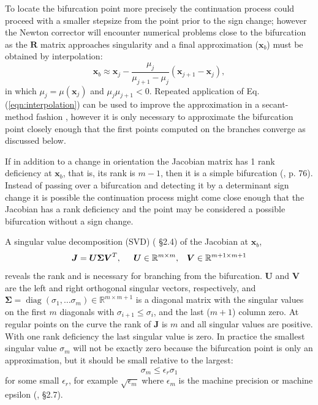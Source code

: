 \documentclass[11pt,openany,twoside]{book}
\numberwithin{equation}{section}		%
\newcommand{\Matrix}[1]{\boldsymbol{#1}}
\newcommand{\Vector}[1]{\boldsymbol{#1}}
\newcommand{\Diag}{\operatorname{diag}}
\begin{document}
To locate the bifurcation point more precisely the
continuation process could proceed with a smaller stepsize from
the point prior to the sign change; however the Newton corrector will
encounter numerical problems close to the bifurcation as the $\Matrix{R}$
matrix approaches singularity
and a final approximation ($\Vector{x}_b$)
must be obtained by interpolation:
\begin{equation}
\label{eqn:interpolation}
\Vector{x}_b \approx \Vector{x}_j - \frac{\mu_j}{\mu_{j+1}
	- \mu_j}\left( \Vector{x}_{j+1} - \Vector{x}_j\right),
\end{equation}
in which $\mu_j = \mu(\Vector{x}_j)$ and $\mu_j\mu_{j+1} < 0$.
Repeated application of Eq. (\ref{eqn:interpolation})
can be used to
improve the approximation in a secant-method fashion \cite{keller1987lectures},
however it is only necessary to approximate the bifurcation
point closely enough that the first points computed on the
branches converge as discussed below.
\par
If in addition to a change in orientation the 
Jacobian matrix has 1 rank deficiency at $\Vector{x}_b$, that is,
its rank is $m-1$,
then it is a simple bifurcation (\cite{allgower1990numerical}, p. 76).
Instead of passing over a bifurcation and detecting it by a determinant sign
change it is possible the continuation process might come close enough
that the Jacobian has a rank deficiency and the point may be considered
a possible bifurcation without a sign change.
\par
A singular value decomposition (SVD) (\cite{golub2013matrix} \S 2.4)
of the Jacobian at $\Vector{x}_b$,
\begin{equation}
\Matrix{J} = \Matrix{U}\Matrix{\Sigma}\Matrix{V}^T, \hspace{0.2in} 
	\Matrix{U} \in \mathbb{R}^{m \times m}, \;\;\;
	\Matrix{V} \in \mathbb{R}^{m+1 \times m+1}		\nonumber
\end{equation}
reveals the rank and is necessary for branching from the bifurcation.
$\Matrix{U}$ and $\Matrix{V}$ are the left and right orthogonal singular
vectors, respectively, and
$\Matrix{\Sigma} = \Diag (\sigma_1, \dots \sigma_m) \in \mathbb{R}^{m \times m+1}$
is a diagonal matrix with the singular values on the first $m$ diagonals
with $\sigma_{i+1} \le \sigma_i$,
and the last ($m+1$) column zero.
At regular points on the curve
the rank of $\Matrix{J}$ is $m$ and all singular values
are positive.
With one rank deficiency the last singular value is zero.
In practice the smallest singular value $\sigma_m$ will not be exactly zero
because the bifurcation point is only an approximation, but it
should be small relative to the largest:
\begin{equation}
\label{eqn:rankdef}
\sigma_m \leq \epsilon_r \sigma_1
\end{equation}
for some small $\epsilon_r$, for example $\sqrt{\epsilon_m}$
where $\epsilon_m$ is the machine precision or machine epsilon
(\cite{golub2013matrix}, \S 2.7).
\end{document}
